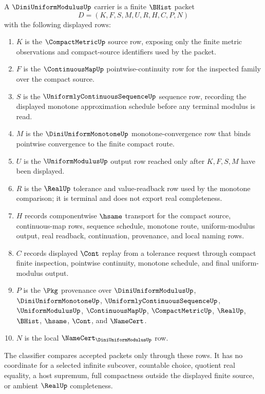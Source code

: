 \begin{definition}
\label{def:dini-uniform-modulus-carrier}
A $\DiniUniformModulusUp$ carrier is a finite $\BHist$ packet
$$
D=(K,F,S,M,U,R,H,C,P,N)
$$
with the following displayed rows:
\begin{enumerate}
\item $K$ is the $\CompactMetricUp$ source row, exposing only the finite metric observations and compact-source identifiers used by the packet.
\item $F$ is the $\ContinuousMapUp$ pointwise-continuity row for the inspected family over the compact source.
\item $S$ is the $\UniformlyContinuousSequenceUp$ sequence row, recording the displayed monotone approximation schedule before any terminal modulus is read.
\item $M$ is the $\DiniUniformMonotoneUp$ monotone-convergence row that binds pointwise convergence to the finite compact route.
\item $U$ is the $\UniformModulusUp$ output row reached only after $K,F,S,M$ have been displayed.
\item $R$ is the $\RealUp$ tolerance and value-readback row used by the monotone comparison; it is terminal and does not export real completeness.
\item $H$ records componentwise $\hsame$ transport for the compact source, continuous-map rows, sequence schedule, monotone route, uniform-modulus output, real readback, continuation, provenance, and local naming rows.
\item $C$ records displayed $\Cont$ replay from a tolerance request through compact finite inspection, pointwise continuity, monotone schedule, and final uniform-modulus output.
\item $P$ is the $\Pkg$ provenance over $\DiniUniformModulusUp$, $\DiniUniformMonotoneUp$, $\UniformlyContinuousSequenceUp$, $\UniformModulusUp$, $\ContinuousMapUp$, $\CompactMetricUp$, $\RealUp$, $\BHist$, $\hsame$, $\Cont$, and $\NameCert$.
\item $N$ is the local $\NameCert_{\DiniUniformModulusUp}$ row.
\end{enumerate}
The classifier compares accepted packets only through these rows. It has no coordinate for a selected infinite subcover, countable choice, quotient real equality, a host supremum, full compactness outside the displayed finite source, or ambient $\RealUp$ completeness.
\end{definition}

